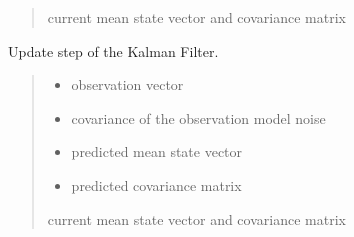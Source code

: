 \documentclass[letterpaper,10pt,english]{sphinxmanual}
\begin{document}
\begin{fulllineitems}
\begin{fulllineitems}
\begin{quote}
\begin{description}
\begin{itemize}
\end{itemize}

\sphinxAtStartPar
current mean state vector and covariance matrix

\end{description}\end{quote}

\end{fulllineitems}


\begin{fulllineitems}
\label{\detokenize{KF:KF.KF.Update}}
\pysigstartsignatures
{}
\pysigstopsignatures
\sphinxAtStartPar
Update step of the Kalman Filter.
\begin{quote}\begin{description}
\begin{itemize}
\item {} 
\sphinxAtStartPar
{} \textendash{} observation vector

\item {} 
\sphinxAtStartPar
{} \textendash{} covariance of the observation model noise

\item {} 
\sphinxAtStartPar
{} \textendash{} predicted mean state vector

\item {} 
\sphinxAtStartPar
{} \textendash{} predicted covariance matrix

\end{itemize}

\sphinxAtStartPar
current mean state vector and covariance matrix

\end{description}\end{quote}

\end{fulllineitems}


\end{fulllineitems}
\end{document}
